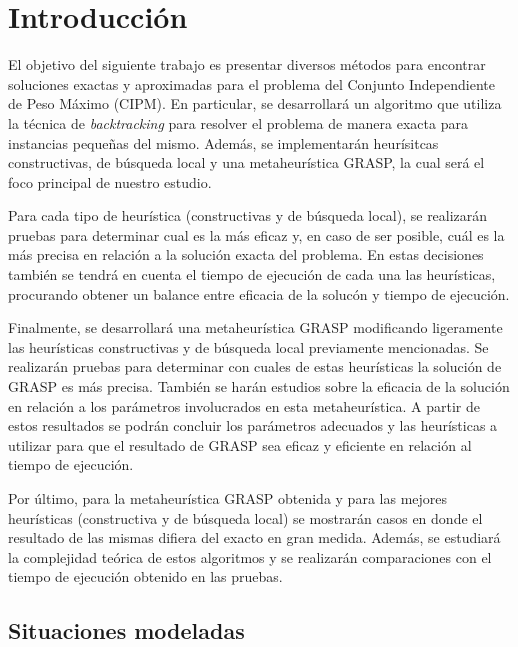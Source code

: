 \documentclass[a4paper,11pt] {article}
\begin{document}

\section{Introducci\'on}

El objetivo del siguiente trabajo es presentar diversos m\'etodos para encontrar soluciones exactas y aproximadas para el problema del Conjunto Independiente de Peso M\'aximo (CIPM). En particular, se desarrollar\'a un algoritmo que utiliza la t\'ecnica de \textit{backtracking} para resolver el problema de manera exacta para instancias peque\~{n}as del mismo. Adem\'as, se implementar\'an heur\'isitcas constructivas, de b\'usqueda local y una metaheur\'istica GRASP, la cual ser\'a el foco principal de nuestro estudio.

Para cada tipo de heur\'istica (constructivas y de b\'usqueda local), se realizar\'an pruebas para determinar cual es la m\'as eficaz y, en caso de ser posible, cu\'al es la m\'as precisa en relaci\'on a la soluci\'on exacta del problema. En estas decisiones tambi\'en se tendr\'a en cuenta el tiempo de ejecuci\'on de cada una las heur\'isticas, procurando obtener un balance entre eficacia de la soluc\'on y tiempo de ejecuci\'on.

Finalmente, se desarrollar\'a una metaheur\'istica GRASP modificando ligeramente las heur\'isticas constructivas y de b\'usqueda local previamente mencionadas. Se realizar\'an pruebas para determinar con cuales de estas heur\'isticas la soluci\'on de GRASP es m\'as precisa. Tambi\'en se har\'an estudios sobre la eficacia de la soluci\'on en relaci\'on a los par\'ametros involucrados en esta metaheur\'istica. A partir de estos resultados se podr\'an concluir los par\'ametros adecuados y las heur\'isticas a utilizar para que el resultado de GRASP sea eficaz y eficiente en relaci\'on al tiempo de ejecuci\'on.

Por \'ultimo, para la metaheur\'istica GRASP obtenida y para las mejores heur\'isticas (constructiva y de b\'usqueda local) se mostrar\'an casos en donde el resultado de las mismas difiera del exacto en gran medida. Adem\'as, se estudiar\'a la complejidad te\'orica de estos algoritmos y se realizar\'an comparaciones con el tiempo de ejecuci\'on obtenido en las pruebas.

\subsection{Situaciones modeladas}
\end{document}
